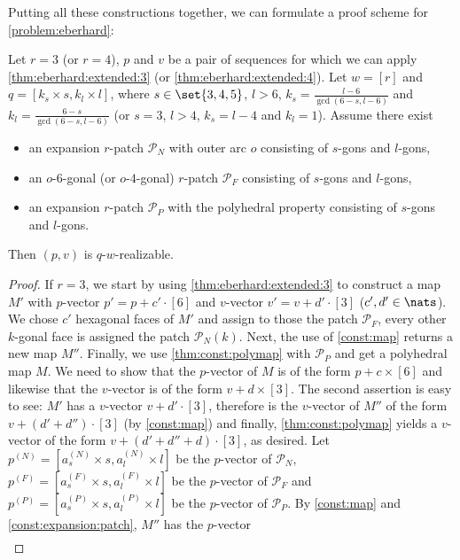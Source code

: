 Putting all these constructions together, we can formulate a proof scheme for \autoref{problem:eberhard}:
\begin{proposition}\label{thm:main:const} Let $r = 3$ (or $r = 4$), $p$ and $v$ be a pair of sequences for which we can apply \autoref{thm:eberhard:extended:3} (or \autoref{thm:eberhard:extended:4}). Let $w = [r]$ and $q = [k_s \times s, k_l \times l]$, where $s \in \set{3, 4, 5}$, $l > 6$, $k_s = \frac{l - 6}{\gcd(6 - s, l - 6)}$ and $k_l = \frac{6 - s}{\gcd(6 - s, l - 6)}$ (or $s = 3$, $l > 4$, $k_s = l - 4$ and $k_l = 1$). Assume there exist
  \begin{itemize}
  \item an expansion $r$-patch $\mathcal{P}_N$ with outer arc $o$ consisting of $s$-gons and $l$-gons,
  \item an $o$-$6$-gonal (or $o$-$4$-gonal) $r$-patch $\mathcal{P}_F$ consisting of $s$-gons and $l$-gons,
  \item an expansion $r$-patch $\mathcal{P}_P$ with the polyhedral property consisting of $s$-gons and $l$-gons.
  \end{itemize}
  Then $(p, v)$ is $q$-$w$-realizable.
  \begin{proof}
    If $r = 3$, we start by using \autoref{thm:eberhard:extended:3} to construct a map $M'$ with $p$-vector $p' = p + c' \cdot [6]$ and $v$-vector $v' = v + d' \cdot [3]$ ($c', d' \in \nats$). We chose $c'$ hexagonal faces of $M'$ and assign to those the patch $\mathcal{P}_F$, every other $k$-gonal face is assigned the patch $\mathcal{P}_N(k)$. Next, the use of \autoref{const:map} returns a new map $M''$. Finally, we use \autoref{thm:const:polymap} with $\mathcal{P}_P$ and get a polyhedral map $M$. We need to show that the $p$-vector of $M$ is of the form $p + c \times [6]$ and likewise that the $v$-vector is of the form $v + d \times [3]$. The second assertion is easy to see: $M'$ has a $v$-vector $v + d' \cdot [3]$, therefore is the $v$-vector of $M''$ of the form $v + (d' + d'') \cdot [3]$ (by \autoref{const:map}) and finally, \autoref{thm:const:polymap} yields a $v$-vector of the form $v + (d' + d'' + d) \cdot [3]$, as desired. Let $p^{(N)} = [a^{(N)}_s \times s, a^{(N)}_l \times l]$ be the $p$-vector of $\mathcal{P}_N$, $p^{(F)} = [a^{(F)}_s \times s, a^{(F)}_l \times l]$ be the $p$-vector of $\mathcal{P}_F$ and $p^{(P)} = [a^{(P)}_s \times s, a^{(P)}_l \times l]$ be the $p$-vector of $\mathcal{P}_P$. By \autoref{const:map} and \autoref{const:expansion:patch}, $M''$ has the $p$-vector
    \begin{align*}

\end{align*}
\end{proof}
\end{proposition}
